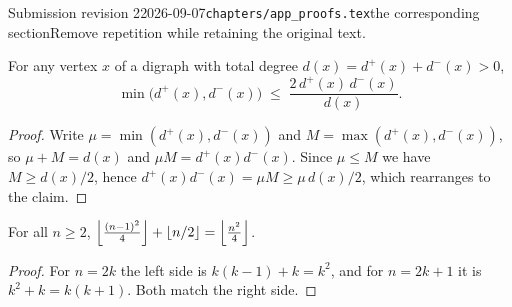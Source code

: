 \begin{offcut}{Submission revision 2}{2026-09-07}{\texttt{chapters/app\_proofs.tex}}{the corresponding section}{Remove repetition while retaining the original text.}
\begin{lemma}
For any vertex $x$ of a digraph with total degree $d(x) = d^+(x) + d^-(x) > 0$,
\[
    \min\bigl(d^+(x), d^-(x)\bigr) \;\le\; \frac{2\,d^+(x)\,d^-(x)}{d(x)} .
\]
\end{lemma}

\begin{proof}
Write $\mu = \min(d^+(x), d^-(x))$ and $M = \max(d^+(x), d^-(x))$, so $\mu + M = d(x)$ and $\mu M = d^+(x)d^-(x)$. Since $\mu \le M$ we have $M \ge d(x)/2$, hence $d^+(x)d^-(x) = \mu M \ge \mu\, d(x)/2$, which rearranges to the claim.
\end{proof}

\begin{lemma}
For all $n \ge 2$, $\left\lfloor \frac{(n-1)^2}{4} \right\rfloor + \left\lfloor n/2 \right\rfloor = \left\lfloor \frac{n^2}{4} \right\rfloor$.
\end{lemma}

\begin{proof}
For $n = 2k$ the left side is $k(k-1) + k = k^2$, and for $n = 2k+1$ it is $k^2 + k = k(k+1)$. Both match the right side.
\end{proof}


\end{offcut}

